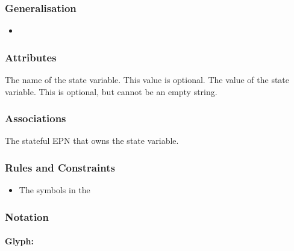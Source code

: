 \subsubsection{Generalisation}

\begin{itemize}
\item {}
\end{itemize}

\subsubsection{Attributes}

\begin{attributes}
   The name of the state variable. This value is
  optional.
   The value of the state variable. This is
  optional, but cannot be an empty string.
\end{attributes}

\subsubsection{Associations}

\begin{attributes}
    The stateful EPN that owns
  the state variable.
\end{attributes}

\subsubsection{Rules and Constraints}

\begin{itemize}
\item The symbols in the 
\end{itemize}

\subsubsection{Notation}


\paragraph{Glyph: }
\label{sec:stateVariable}


